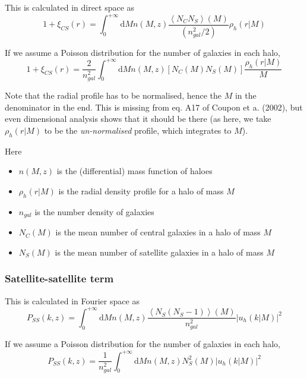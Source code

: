 \documentclass[10pt,a4paper]{article}
\begin{document}
This is calculated in direct space as
\begin{equation}
1 + \xi_{CS}(r) = \int_0^{+\infty} \mathrm{d}M n(M,z) \frac{\left\langle N_C N_S\right\rangle(M)}{(n_{gal}^2/2)}\rho_h(r|M)
\end{equation}

If we assume a Poisson distribution for the number of galaxies in each halo,
\begin{equation}
1 + \xi_{CS}(r) = \frac{2}{n_{gal}^2} \int_0^{+\infty} \mathrm{d}M n(M,z) \left[N_C(M) N_S(M)\right] \frac{\rho_h(r|M)}{M}
\end{equation}

Note that the radial profile has to be normalised, hence the $M$ in the denominator in the end. 
This is missing from eq. A17 of Coupon et a. (2002), but even dimensional analysis shows that it should be there (as here, we take $\rho_h(r|M)$ to be the \emph{un-normalised} profile, which integrates to $M$).



Here
\begin{itemize}
\item $n(M,z)$ is the (differential) mass function of haloes
\item $\rho_h(r|M)$ is the radial density profile for a halo of mass $M$
\item $n_{gal}$ is the number density of galaxies
\item $N_C(M)$ is the mean number of central galaxies in a halo of mass $M$
\item $N_S(M)$ is the mean number of satellite galaxies in a halo of mass $M$
\end{itemize}

\subsubsection{Satellite-satellite term}

This is calculated in Fourier space as
\begin{equation}
P_{SS}(k,z) = \int_0^{+\infty} \mathrm{d}M n(M,z) \frac{\left\langle N_S (N_S - 1) \right\rangle(M)}{n_{gal}^2} \left| u_h(k|M)\right|^2
\end{equation}

If we assume a Poisson distribution for the number of galaxies in each halo,
\begin{equation}
P_{SS}(k,z) = \frac{1}{n_{gal}^2}\int_0^{+\infty} \mathrm{d}M n(M,z) N_S^2(M) \left| u_h(k|M)\right|^2
\end{equation}
\end{document}
